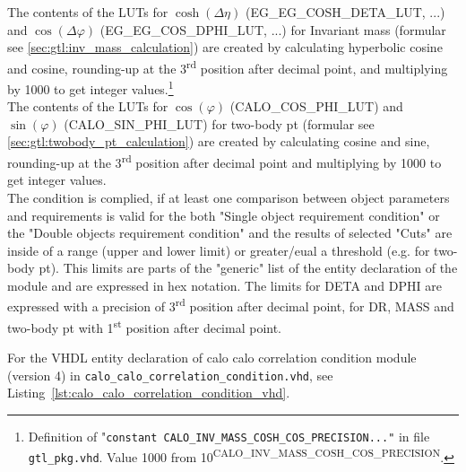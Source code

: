 The contents of the LUTs for $\cosh(\Delta\eta)$ (\small{EG\_EG\_COSH\_DETA\_LUT}\normalsize, ...) and $\cos(\Delta\varphi)$ (\small{EG\_EG\_COS\_DPHI\_LUT}\normalsize, ...) for Invariant mass (formular see \ref{sec:gtl:inv_mass_calculation}) are created by calculating hyperbolic cosine and cosine, rounding-up at the 3\textsuperscript{rd} position after decimal point, and multiplying by 1000 to get integer values.\footnote{Definition of "\texttt{constant \small{CALO\_INV\_MASS\_COSH\_COS\_PRECISION}\normalsize ..."} in file \texttt{gtl\_pkg.vhd}. Value 1000 from 10\textsuperscript{\tiny{CALO\_INV\_MASS\_COSH\_COS\_PRECISION}}\normalsize.}\\
The contents of the LUTs for $\cos(\varphi)$ (\small{CALO\_COS\_PHI\_LUT}\normalsize) and $\sin(\varphi)$ (\small{CALO\_SIN\_PHI\_LUT}\normalsize) for two-body pt
(formular see \ref{sec:gtl:twobody_pt_calculation}) are created by calculating cosine and sine, rounding-up at the 3\textsuperscript{rd} position after decimal point and 
multiplying by 1000 to get integer values.\\
The condition is complied, if at least one comparison between object parameters and requirements is valid for the both "Single object requirement condition" or the "Double objects requirement condition" and the results of selected "Cuts" are inside of a range (upper and lower limit) or greater/eual a threshold (e.g. for two-body pt).
This limits are parts of the "generic" list of the entity declaration of the module and are expressed in hex notation. The limits for DETA and DPHI
are expressed with a precision of 3\textsuperscript{rd} position after decimal point, for DR, MASS and two-body pt with 1\textsuperscript{st} position after decimal point.

For the VHDL entity declaration of calo calo correlation condition module (version 4) in \texttt{calo\_calo\_correlation\_condition.vhd}, see Listing~\ref{lst:calo_calo_correlation_condition_vhd}.\\
\clearpage


